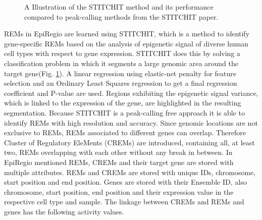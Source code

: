 \documentclass[pdftex,12pt,a4paper]{report}
\begin{document}
\begin{figure}[!ht]
\begin{center}
	\caption{A Illustration of the STITCHIT method and its performance compared to peak-calling methods from the STITCHIT paper\cite{stitchit}.}
	\label{stitchit}
\end{center}
\end{figure}
REMs in EpiRegio are learned using STITCHIT\cite{stitchit}, which is a method to identify gene-specific REMs based on the analysis of epigenetic signal of diverse human cell types with respect to gene expression. STITCHIT does this by solving a classification problem in which it segments a large genomic area around the target gene(Fig. \ref{stitchit}). A linear regression using elastic-net penalty for feature selection and an Ordinary Least Squares regression to get a final regression coefficient and P-value are used. Regions exhibiting the epigenetic signal variance, which is linked to the expression of the gene, are highlighted in the resulting segmentation. Because STITCHIT is a peak-calling free approach it is able to identify REMs with high resolution and accuracy. Since genomic locations are not exclusive to REMs, REMs associated to different genes can overlap. Therefore Cluster of Regulatory EleMents (CREMs) are introduced, containing all, at least two, REMs overlapping with each other without any break in between. 
In EpiRegio mentioned REMs, CREMs and their target gene are stored with multiple attributes. REMs and CREMs are stored with unique IDs, chromosome, start position and end position. Genes are stored with their Ensemble ID, also chromosome, start position, end position and their expression value in the respective cell type and sample. The linkage between CREMs and REMs and genes has the following activity values. 
\end{document}
